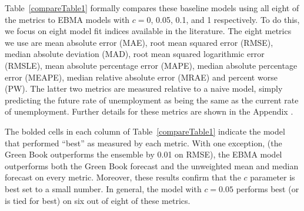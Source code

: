 \documentclass[12pt,fullpage,endnotes]{article}
\begin{document}
Table~\ref{compareTable1} formally compares these baseline models
using all eight of the metrics to EBMA models with $c=$0, 0.05, 0.1,
and 1 respectively.  To do this, we focus on eight model fit indices
available in the literature.  The eight metrics we use are mean
absolute error (MAE), root mean squared error (RMSE), median absolute
deviation (MAD), root mean squared logarithmic error (RMSLE), mean
absolute percentage error (MAPE), median absolute percentage error
(MEAPE), median relative absolute error (MRAE) and percent worse (PW).
The latter two metrics are measured relative to a naive model, simply
predicting the future rate of unemployment as being the same as the
current rate of unemployment.  Further details for these metrics are
shown in the Appendix \citep{brandt:freeman:schrodt:2011}.


The bolded cells in each column of Table~\ref{compareTable1} indicate
the model that performed ``best'' as measured by each metric.  With
one exception, (the Green Book outperforms the ensemble by 0.01 on
RMSE), the EBMA model outperforms both the Green Book forecast and the
unweighted mean and median forecast on every metric.  Moreover, these
results confirm that the $c$ parameter is best set to a small number.
In general, the model with $c=0.05$ performs best (or is tied for
best) on six out of eight of these metrics.





\end{document}

